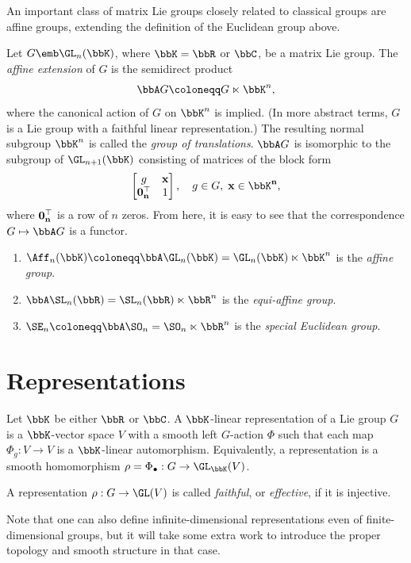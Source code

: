 An important class of matrix Lie groups closely related to classical groups are affine groups, extending the definition of the Euclidean group above.

\begin{defn}
    Let $G\emb \GL_n(\bbK)$, where $\bbK=\bbR$ or $\bbC$, be a matrix Lie group. The \emph{affine extension} of $G$ is the semidirect product 
    \[\bbA G\coloneqq G\ltimes \bbK^n,\]
    where the canonical action of $G$ on $\bbK^n$ is implied. (In more abstract terms, $G$ is a Lie group with a faithful linear representation.) The resulting normal subgroup $\bbK^n$ is called the \emph{group of translations}. $\bbA G$ is isomorphic to the subgroup of $\GL_{n+1}(\bbK)$ consisting of matrices of the block form
    \[\begin{bmatrix}
        g & \bf{x}\\
        \bf{0}_n^\top  & 1
    \end{bmatrix},\quad g\in G,\; \bf{x}\in\bbK^n,\]
    where $\bf{0}_n^\top $ is a row of $n$ zeros. From here, it is easy to see that the correspondence $G\mapsto \bbA G$ is a functor.
\end{defn}

\begin{example}
    \begin{enumerate}
        \item $\Aff_n(\bbK)\coloneqq \bbA \GL_n(\bbK)=\GL_n(\bbK)\ltimes\bbK^n$ is the \emph{affine group}.
        \item $\bbA \SL_n(\bbR)=\SL_n(\bbR)\ltimes \bbR^n$ is the \emph{equi-affine group}.
        \item $\SE_n\coloneqq \bbA \SO_n{}= \SO_n\ltimes\bbR^n$ is the \emph{special Euclidean group}.
    \end{enumerate}
\end{example}










\section{Representations}

\begin{defn}
    Let $\bbK$ be either $\bbR$ or $\bbC$. A $\bbK$-linear representation of a Lie group $G$ is a $\bbK$-vector space $V$ with a smooth left $G$-action $\Phi$ such that each map $\Phi_g:V\to V$ is a $\bbK$-linear automorphism. Equivalently, a representation is a smooth homomorphism $\rho=\Phi_\bullet:G\to \GL_{\bbK}(V)$. 

    A representation $\rho :G\to \GL(V)$ is called \emph{faithful}, or \emph{effective}, if it is injective.
\end{defn}
Note that one can also define infinite-dimensional representations even of finite-dimensional groups, but it will take some extra work to introduce the proper topology and smooth structure in that case.

